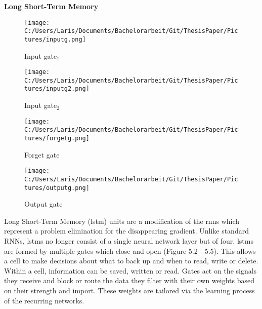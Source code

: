 \documentclass[a4paper, 11pt,titlepage,oneside,openany]{book}
\begin{document}
\noindent \textbf{Long Short-Term Memory} \\
\begin{figure}[h]
	\begin{minipage}[b]{0.4\linewidth}
		\texttt{[image: C:/Users/Laris/Documents/Bachelorarbeit/Git/ThesisPaper/Pictures/inputg.png]}
		\caption{Input gate$_1$ \cite{rnn}}
	\end{minipage}
	\hfill
	\begin{minipage}[b]{0.4\linewidth}
		\texttt{[image: C:/Users/Laris/Documents/Bachelorarbeit/Git/ThesisPaper/Pictures/inputg2.png]}
		\caption{Input gate$_2$ \cite{rnn}}
	\end{minipage}
	\begin{minipage}[b]{0.4\linewidth}
		\texttt{[image: C:/Users/Laris/Documents/Bachelorarbeit/Git/ThesisPaper/Pictures/forgetg.png]}
		\caption{Forget gate \cite{rnn}}
	\end{minipage}
	\hfill
	\begin{minipage}[b]{0.4\linewidth}
		\texttt{[image: C:/Users/Laris/Documents/Bachelorarbeit/Git/ThesisPaper/Pictures/outputg.png]}
		\caption{Output gate \cite{rnn}}
	\end{minipage}
\end{figure}
\noindent Long Short-Term Memory (\gls{lstm}) units are a modification of the \gls{rnn}s which represent a problem elimination for the disappearing gradient. Unlike standard RNNs, \gls{lstm}s no longer consist of a single neural network layer but of four. \gls{lstm}s are formed by multiple gates which close and open (Figure 5.2 - 5.5). This allows a cell to make decisions about what to back up and when to read, write or delete. Within a cell, information can be saved, written or read. Gates act on the signals they receive and block or route the data they filter with their own weights based on their strength and import. These weights are tailored via the learning process of the recurring networks. 
\end{document}
